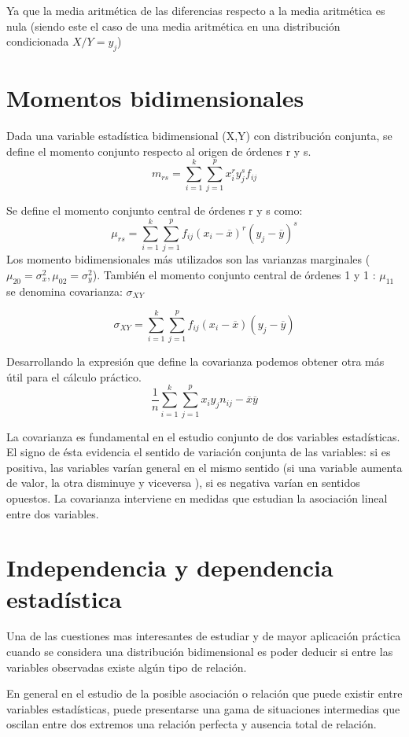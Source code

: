 \documentclass{article}
\begin{document}
Ya que la media aritmética de las diferencias respecto a la media aritmética es nula (siendo este el caso de una media aritmética en una distribución condicionada $X/Y=y_j$)
	
\section{Momentos bidimensionales}
	Dada una variable estadística bidimensional (X,Y) con distribución conjunta, se define el momento conjunto respecto al origen de órdenes r y s.
	$$ m_{rs} = \sum_{i=1}^k \sum_{j=1}^p x_i^r y_j^s f_{ij}$$
	
	Se define el momento conjunto central de órdenes r y s como:
	$$ \mu _{rs} = \sum_{i=1}^k \sum_{j=1}^p f_{ij} ( x_i - \overline{x} )^r (y_j - \overline{y} )^s
$$
	Los momento bidimensionales más utilizados son las varianzas marginales ($\mu_{20}=\sigma_x^2, \mu_{02}=\sigma_y^2$). También el momento conjunto central de órdenes 1 y 1 : $\mu _{11}$ se denomina covarianza: $\sigma_{XY}$
	
	$$\sigma_{XY} = \sum_{i=1}^k \sum_{j=1}^p f_{ij} (x_i - \overline{x} )( y_j - \overline{y} )$$
	
	Desarrollando la expresión que define la covarianza podemos obtener otra más útil para el cálculo práctico. 
	$$ \frac{1}{n} \sum_{i=1}^k \sum_{j=1}^p x_i y_j n_{ij} - \overline{x} \overline{y} $$
	
	La covarianza es fundamental en el estudio conjunto de dos variables estadísticas. El signo de ésta evidencia el sentido de variación conjunta de las variables: si es positiva, las variables varían general en el mismo sentido (si una variable aumenta de valor, la otra disminuye y viceversa ), si es negativa varían en sentidos opuestos. La covarianza interviene en medidas que estudian la asociación lineal entre dos variables.
 \section{Independencia y dependencia estadística}
 
 Una de las cuestiones mas interesantes de estudiar y de mayor aplicación práctica cuando se considera una distribución bidimensional es poder deducir si entre las variables observadas existe algún tipo de relación.
 
 En general en el estudio de la posible asociación o relación que puede existir entre variables estadísticas, puede presentarse una gama de situaciones intermedias que oscilan entre dos extremos una relación perfecta y ausencia total de relación.
\end{document}
